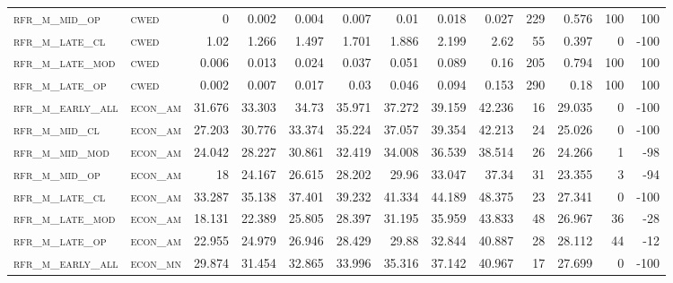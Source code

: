 \begin{landscape}
\begin{center}
\begin{footnotesize}
\begin{longtable}{llrrrrrrrr|rrr}
\textsc{rfr\_m\_mid\_op   } & \textsc{cwed      }   & 0       & 0.002   & 0.004   & 0.007    & 0.01     & 0.018    & 0.027    & 229    & 0.576         & 100           & 100             \\
\textsc{rfr\_m\_late\_cl  } & \textsc{cwed      }   & 1.02    & 1.266   & 1.497   & 1.701    & 1.886    & 2.199    & 2.62     & 55     & 0.397         & 0             & -100            \\
\textsc{rfr\_m\_late\_mod } & \textsc{cwed      }   & 0.006   & 0.013   & 0.024   & 0.037    & 0.051    & 0.089    & 0.16     & 205    & 0.794         & 100           & 100             \\
\textsc{rfr\_m\_late\_op  } & \textsc{cwed      }   & 0.002   & 0.007   & 0.017   & 0.03     & 0.046    & 0.094    & 0.153    & 290    & 0.18          & 100           & 100             \\
\textsc{rfr\_m\_early\_all} & \textsc{econ\_am  }   & 31.676  & 33.303  & 34.73   & 35.971   & 37.272   & 39.159   & 42.236   & 16     & 29.035        & 0             & -100            \\
\textsc{rfr\_m\_mid\_cl   } & \textsc{econ\_am  }   & 27.203  & 30.776  & 33.374  & 35.224   & 37.057   & 39.354   & 42.213   & 24     & 25.026        & 0             & -100            \\
\textsc{rfr\_m\_mid\_mod  } & \textsc{econ\_am  }   & 24.042  & 28.227  & 30.861  & 32.419   & 34.008   & 36.539   & 38.514   & 26     & 24.266        & 1             & -98             \\
\textsc{rfr\_m\_mid\_op   } & \textsc{econ\_am  }   & 18      & 24.167  & 26.615  & 28.202   & 29.96    & 33.047   & 37.34    & 31     & 23.355        & 3             & -94             \\
\textsc{rfr\_m\_late\_cl  } & \textsc{econ\_am  }   & 33.287  & 35.138  & 37.401  & 39.232   & 41.334   & 44.189   & 48.375   & 23     & 27.341        & 0             & -100            \\
\textsc{rfr\_m\_late\_mod } & \textsc{econ\_am  }   & 18.131  & 22.389  & 25.805  & 28.397   & 31.195   & 35.959   & 43.833   & 48     & 26.967        & 36            & -28             \\
\textsc{rfr\_m\_late\_op  } & \textsc{econ\_am  }   & 22.955  & 24.979  & 26.946  & 28.429   & 29.88    & 32.844   & 40.887   & 28     & 28.112        & 44            & -12             \\
\textsc{rfr\_m\_early\_all} & \textsc{econ\_mn  }   & 29.874  & 31.454  & 32.865  & 33.996   & 35.316   & 37.142   & 40.967   & 17     & 27.699        & 0             & -100            \\

\end{longtable}
\end{footnotesize}
\end{center}
\end{landscape}
